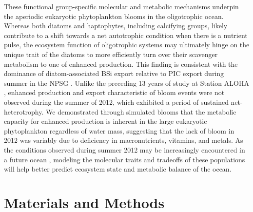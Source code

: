 These functional group-specific molecular and metabolic mechanisms underpin the aperiodic eukaryotic phytoplankton blooms in the oligotrophic ocean. Whereas both diatoms and haptophytes, including calcifying groups, likely contribute to a shift towards a net autotrophic condition when there is a nutrient pulse, the ecosystem function of oligotrophic systems may ultimately hinge on the unique trait of the diatoms to more efficiently turn over their scavenger metabolism to one of enhanced production. This finding is consistent with the dominance of diatom-associated BSi export relative to PIC export during summer in the NPSG \citep{Karl2012}. Unlike the preceding 13 years of study at Station ALOHA \citep{Karl2012}, enhanced production and export characteristic of bloom events were not observed during the summer of 2012, which exhibited a period of sustained net-heterotrophy. We demonstrated through simulated blooms that the metabolic capacity for enhanced production is inherent in the large eukaryotic phytoplankton regardless of water mass, suggesting that the lack of bloom in 2012 was variably due to deficiency in macronutrients, vitamins, and metals. As the conditions observed during summer 2012 may be increasingly encountered in a future ocean \citep{Doney2012}, modeling the molecular traits and tradeoffs of these populations will help better predict ecosystem state and metabolic balance of the ocean. \par

\section{Materials and Methods}
